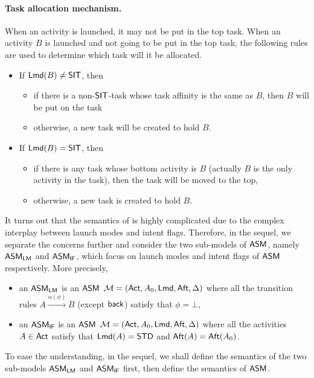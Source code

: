 \paragraph*{Task allocation mechanism.} 
When an activity is launched, it may not be put in the top task. 
When an activity $B$ is launched and not going to be put in the top task, the following rules are used to determine which task will it be allocated. 
\begin{itemize}
	\item If ${\sf Lmd}(B) \neq \mathsf{SIT}$, then
	\begin{itemize}
	 \item if there is a non-$\mathsf{SIT}$-task whose task affinity is the same as $B$, then $B$ will be put on the task
	 \item otherwise, a new task will be created to hold $B$.
	 \end{itemize}
	\item If ${\sf Lmd}(B) = \mathsf{SIT}$, then 
	\begin{itemize}
	\item if there is any task whose bottom activity is $B$ (actually $B$ is the only activity in the task), then the task will be moved to the top, 
	\item otherwise, a new task is created to hold $B$.
	\end{itemize}
\end{itemize}



It turns out that the semantics of {\AMASS} is highly complicated due to the complex interplay between launch modes and intent flags. Therefore, in the sequel, we separate the concerns further and consider the two sub-models of $\textsf{ASM}$, namely $\textsf{ASM}_\textsf{LM}$ and $\textsf{ASM}_\textsf{IF}$, which focus on launch modes and intent flags of $\textsf{ASM}$ respectively. 
More precisely, 
\begin{itemize}
	\item an $\textsf{ASM}_\textsf{LM}$ is an $\textsf{ASM}$ ${\mathcal{M} } = ({\sf Act}, A_0, {\sf Lmd}, {\sf Aft}, \Delta)$ where all the transition rules $A \xrightarrow{\alpha(\phi)} B$ (except ${\mathsf{back} }$) satisfy that $\phi = \bot$, 
	\item an $\textsf{ASM}_\textsf{IF}$ is an $\textsf{ASM}$ ${\mathcal{M} } = ({\sf Act}, A_0, {\sf Lmd}, {\sf Aft}, \Delta)$ where all the activities $A\in{\sf Act}$ satisfy that ${\sf Lmd}(A) = \mathsf{STD}$ and ${\sf Aft}(A) = {\sf Aft}(A_0)$.
\end{itemize}
To ease the understanding, in the sequel, we shall define the semantics of the two sub-models $\textsf{ASM}_\textsf{LM}$ and $\textsf{ASM}_\textsf{IF}$ first, then define the semantics of $\textsf{ASM}$. 



